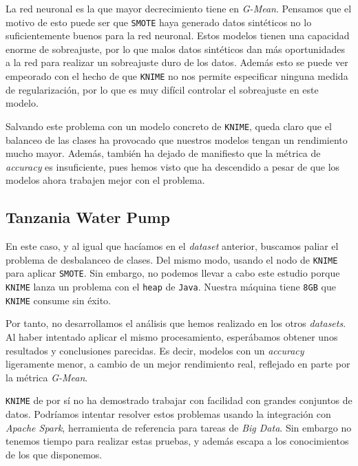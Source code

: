 \documentclass[11pt]{article}
\begin{document}
La red neuronal es la que mayor decrecimiento tiene en \emph{G-Mean}. Pensamos que el motivo de esto puede ser que \lstinline{SMOTE} haya generado datos sintéticos no lo suficientemente buenos para la red neuronal. Estos modelos tienen una capacidad enorme de sobreajuste, por lo que malos datos sintéticos dan más oportunidades a la red para realizar un sobreajuste duro de los datos. Además esto se puede ver empeorado con el hecho de que \lstinline{KNIME} no nos permite especificar ninguna medida de regularización, por lo que es muy difícil controlar el sobreajuste en este modelo.

Salvando este problema con un modelo concreto de \lstinline{KNIME}, queda claro que el balanceo de las clases ha provocado que nuestros modelos tengan un rendimiento mucho mayor. Además, también ha dejado de manifiesto que la métrica de \emph{accuracy} es insuficiente, pues hemos visto que ha descendido a pesar de que los modelos ahora trabajen mejor con el problema.

\pagebreak

\subsection{Tanzania Water Pump}

En este caso, y al igual que hacíamos en el \emph{dataset} anterior, buscamos paliar el problema de desbalanceo de clases. Del mismo modo, usando el nodo de \lstinline{KNIME} para aplicar \lstinline{SMOTE}. Sin embargo, no podemos llevar a cabo este estudio porque \lstinline{KNIME} lanza un problema con el \lstinline{heap} de \lstinline{Java}. Nuestra máquina tiene \lstinline{8GB} que \lstinline{KNIME} consume sin éxito.

Por tanto, no desarrollamos el análisis que hemos realizado en los otros \emph{datasets}. Al haber intentado aplicar el mismo procesamiento, esperábamos obtener unos resultados y conclusiones parecidas. Es decir, modelos con un \emph{accuracy} ligeramente menor, a cambio de un mejor rendimiento real, reflejado en parte por la métrica \emph{G-Mean}.

\lstinline{KNIME} de por sí no ha demostrado trabajar con facilidad con grandes conjuntos de datos. Podríamos intentar resolver estos problemas usando la integración con \emph{Apache Spark}, herramienta de referencia para tareas de \emph{Big Data}. Sin embargo no tenemos tiempo para realizar estas pruebas, y además escapa a los conocimientos de los que disponemos.

\pagebreak
\end{document}
